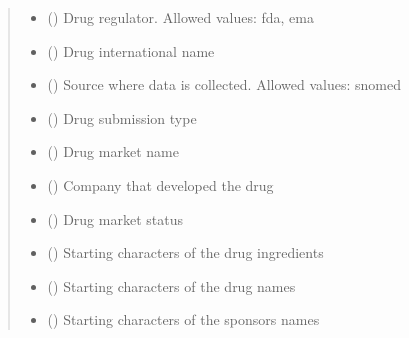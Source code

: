 \documentclass[letterpaper,10pt,english]{sphinxmanual}
\begin{document}
\begin{fulllineitems}
\begin{fulllineitems}
\begin{quote}
\begin{description}
\begin{itemize}
\item {} 
\sphinxAtStartPar
{} () \textendash{} Drug regulator. Allowed values: fda, ema

\item {} 
\sphinxAtStartPar
{} () \textendash{} Drug international name

\item {} 
\sphinxAtStartPar
{} () \textendash{} Source where data is collected. Allowed values: snomed

\item {} 
\sphinxAtStartPar
{} () \textendash{} Drug submission type

\item {} 
\sphinxAtStartPar
{} () \textendash{} Drug market name

\item {} 
\sphinxAtStartPar
{} () \textendash{} Company that developed the drug

\item {} 
\sphinxAtStartPar
{} () \textendash{} Drug market status

\item {} 
\sphinxAtStartPar
{} () \textendash{} Starting characters of the drug ingredients

\item {} 
\sphinxAtStartPar
{} () \textendash{} Starting characters of the drug names

\item {} 
\sphinxAtStartPar
{} () \textendash{} Starting characters of the sponsors names


\end{itemize}
\end{description}
\end{quote}
\end{fulllineitems}
\end{fulllineitems}
\end{document}
